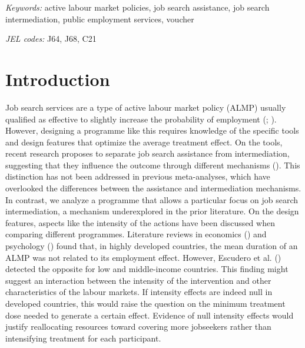 \documentclass[
  11pt]{article}
\begin{document}
\bigskip
\noindent%
{\it Keywords:} active labour market policies, job search
assistance, job search intermediation, public employment
services, voucher
\vfill

\noindent%
{\it JEL codes:} J64, J68, C21
\vfill


\newpage
{} %

\section{Introduction}\label{sec-intro}

Job search services are a type of active labour market policy (ALMP)
usually qualified as effective to slightly increase the probability of
employment (;
). However, designing a
programme like this requires knowledge of the specific tools and design
features that optimize the average treatment effect. On the tools,
recent research proposes to separate job search assistance from
intermediation, suggesting that they influence the outcome through
different mechanisms (). This distinction has not been addressed in previous
meta-analyses, which have overlooked the differences between the
assistance and intermediation mechanisms. In contrast, we analyze a
programme that allows a particular focus on job search intermediation, a
mechanism underexplored in the prior literature. On the design features,
aspects like the intensity of the actions have been discussed when
comparing different programmes. Literature reviews in economics
() and psychology
() found that, in highly
developed countries, the mean duration of an ALMP was not related to its
employment effect. However, Escudero et al.
() detected the opposite for low
and middle-income countries. This finding might suggest an interaction
between the intensity of the intervention and other characteristics of
the labour markets. If intensity effects are indeed null in developed
countries, this would raise the question on the minimum treatment dose
needed to generate a certain effect. Evidence of null intensity effects
would justify reallocating resources toward covering more jobseekers
rather than intensifying treatment for each participant.
\end{document}
